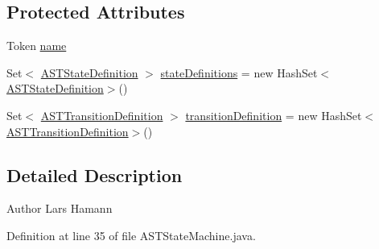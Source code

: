 \subsection*{Protected Attributes}
\begin{DoxyCompactItemize}
\item 
Token \hyperlink{classorg_1_1tzi_1_1use_1_1parser_1_1use_1_1statemachines_1_1_a_s_t_state_machine_a3be9ed130acdc430a1c4d65cea4d3093}{name}
\item 
Set$<$ \hyperlink{classorg_1_1tzi_1_1use_1_1parser_1_1use_1_1statemachines_1_1_a_s_t_state_definition}{A\-S\-T\-State\-Definition} $>$ \hyperlink{classorg_1_1tzi_1_1use_1_1parser_1_1use_1_1statemachines_1_1_a_s_t_state_machine_a0d9ff396ea362ee872af4f82b5ea2b0b}{state\-Definitions} = new Hash\-Set$<$\hyperlink{classorg_1_1tzi_1_1use_1_1parser_1_1use_1_1statemachines_1_1_a_s_t_state_definition}{A\-S\-T\-State\-Definition}$>$()
\item 
Set$<$ \hyperlink{classorg_1_1tzi_1_1use_1_1parser_1_1use_1_1statemachines_1_1_a_s_t_transition_definition}{A\-S\-T\-Transition\-Definition} $>$ \hyperlink{classorg_1_1tzi_1_1use_1_1parser_1_1use_1_1statemachines_1_1_a_s_t_state_machine_ae67e67db748f8c7f84567c4137299b1b}{transition\-Definition} = new Hash\-Set$<$\hyperlink{classorg_1_1tzi_1_1use_1_1parser_1_1use_1_1statemachines_1_1_a_s_t_transition_definition}{A\-S\-T\-Transition\-Definition}$>$()
\end{DoxyCompactItemize}


\subsection{Detailed Description}
\begin{DoxyAuthor}{Author}
Lars Hamann 
\end{DoxyAuthor}


Definition at line 35 of file A\-S\-T\-State\-Machine.\-java.



